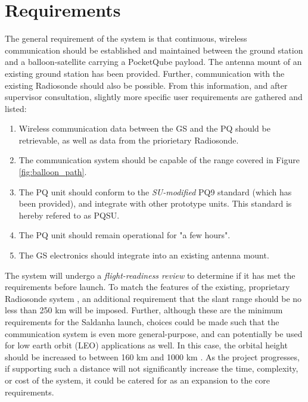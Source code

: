 \section{Requirements}

The general requirement of the system is that continuous, wireless communication should be established and maintained between the ground station and a balloon-satellite carrying a PocketQube payload. The antenna mount of an existing ground station has been provided. Further, communication with the existing Radiosonde should also be possible. From this information, and after supervisor consultation, slightly more specific user requirements are gathered and listed:
\begin{enumerate}
    \item Wireless communication data between the GS and the PQ should be retrievable, as well as data from the priorietary Radiosonde.
    \item The communication system should be capable of the range covered in Figure \ref{fig:balloon_path}.
    \item The PQ unit should conform to the \textit{SU-modified} PQ9 standard (which has been provided), and integrate with other prototype units. This standard is hereby refered to as PQSU.
    \item The PQ unit should remain operational for "a few hours".
    \item The GS electronics should integrate into an existing antenna mount.
\end{enumerate}

The system will undergo a \textit{flight-readiness review} to determine if it has met the requirements before launch. To match the features of the existing, proprietary Radiosonde system \cite{datasheet-iMet3100M}, an additional requirement that the slant range should be no less than 250 km will be imposed. Further, although these are the minimum requirements for the Saldanha launch, choices could be made such that the communication system is even more general-purpose, and can potentially be used for low earth orbit (LEO) applications as well. In this case, the orbital height should be increased to between 160 km and 1000 km \cite{site-esaTypesOrbits}. As the project progresses, if supporting such a distance will not significantly increase the time, complexity, or cost of the system, it could be catered for as an expansion to the core requirements.